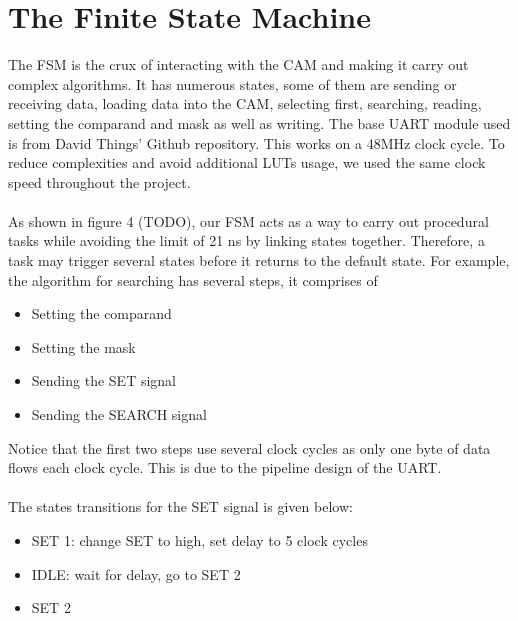 \section{The Finite State Machine}
The FSM is the crux of interacting with the CAM and making it carry out complex algorithms. 
It has numerous states, some of them are sending or receiving data, loading data into the CAM, selecting first, searching, reading, setting the comparand and mask as well as writing. 
The base UART module used is from David Things' Github repository. \cite{uart} This works on a 48MHz clock cycle.
To reduce complexities and avoid additional LUTs usage, we used the same clock speed throughout the project. 
\\\\
As shown in figure 4 (TODO), our FSM acts as a way to carry out procedural tasks while avoiding the limit of 21 ns by linking states together. 
Therefore, a task may trigger several states before it returns to the default state. 
For example, the algorithm for searching has several steps, it comprises of
\begin{itemize}
    \item Setting the comparand 
    \item Setting the mask 
    \item Sending the SET signal 
    \item Sending the SEARCH signal 
\end{itemize}
Notice that the first two steps use several clock cycles as only one byte of data flows each clock cycle. 
This is due to the pipeline design of the UART. 
\\\\
The states transitions for the SET signal is given below:
\begin{itemize}
    \item  SET 1: change SET to high, set delay to 5 clock cycles
    \item  IDLE: wait for delay, go to SET 2
    \item  SET 2
\end{itemize}